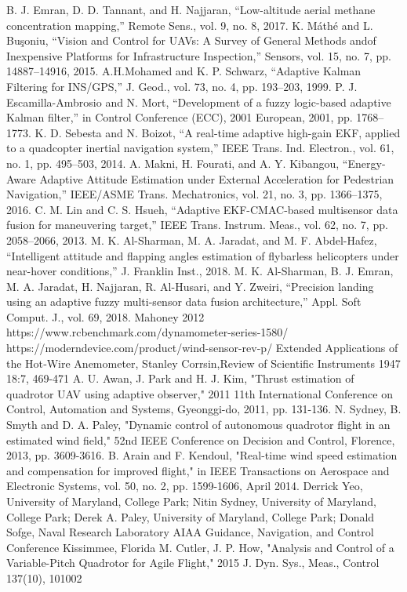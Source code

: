 \documentclass[conference]{IEEEtran}
\begin{document}
\begin{thebibliography}{00}
B. J. Emran, D. D. Tannant, and H. Najjaran, “Low-altitude aerial methane concentration mapping,” Remote Sens., vol. 9, no. 8, 2017.
 K. Máthé and L. Buşoniu, “Vision and Control for UAVs: A Survey of General Methods andof Inexpensive Platforms for Infrastructure Inspection,” Sensors, vol. 15, no. 7, pp. 14887–14916, 2015.
 A.H.Mohamed and K. P. Schwarz, “Adaptive Kalman Filtering for INS/GPS,” J. Geod., vol. 73, no. 4, pp. 193–203, 1999.
 P. J. Escamilla-Ambrosio and N. Mort, “Development of a fuzzy logic-based adaptive Kalman filter,” in Control Conference (ECC), 2001 European, 2001, pp. 1768–1773.
 K. D. Sebesta and N. Boizot, “A real-time adaptive high-gain EKF, applied to a quadcopter inertial navigation system,” IEEE Trans. Ind. Electron., vol. 61, no. 1, pp. 495–503, 2014.
 A. Makni, H. Fourati, and A. Y. Kibangou, “Energy-Aware Adaptive Attitude Estimation under External Acceleration for Pedestrian Navigation,” IEEE/ASME Trans. Mechatronics, vol. 21, no. 3, pp. 1366–1375, 2016.
 C. M. Lin and C. S. Hsueh, “Adaptive EKF-CMAC-based multisensor data fusion for maneuvering target,” IEEE Trans. Instrum. Meas., vol. 62, no. 7, pp. 2058–2066, 2013.
 M. K. Al-Sharman, M. A. Jaradat, and M. F. Abdel-Hafez, “Intelligent attitude and flapping angles estimation of flybarless helicopters under near-hover conditions,” J. Franklin Inst., 2018.
 M. K. Al-Sharman, B. J. Emran, M. A. Jaradat, H. Najjaran, R. Al-Husari, and Y. Zweiri, “Precision landing using an adaptive fuzzy multi-sensor data fusion architecture,” Appl. Soft Comput. J., vol. 69, 2018.
		 Mahoney 2012
 https://www.rcbenchmark.com/dynamometer-series-1580/
 https://moderndevice.com/product/wind-sensor-rev-p/
 Extended Applications of the Hot‐Wire Anemometer, Stanley Corrsin,Review of Scientific Instruments 1947 18:7, 469-471 
 A. U. Awan, J. Park and H. J. Kim, "Thrust estimation of quadrotor UAV using adaptive observer," 2011 11th International Conference on Control, Automation and Systems, Gyeonggi-do, 2011, pp. 131-136.
 N. Sydney, B. Smyth and D. A. Paley, "Dynamic control of autonomous quadrotor flight in an estimated wind field," 52nd IEEE Conference on Decision and Control, Florence, 2013, pp. 3609-3616.
 B. Arain and F. Kendoul, "Real-time wind speed estimation and compensation for improved flight," in IEEE Transactions on Aerospace and Electronic Systems, vol. 50, no. 2, pp. 1599-1606, April 2014.
Derrick Yeo, University of Maryland, College Park; Nitin Sydney, University of Maryland, College Park; Derek A. Paley, University of Maryland, College Park; Donald Sofge, Naval Research Laboratory AIAA Guidance, Navigation, and Control Conference Kissimmee, Florida
  M. Cutler, J. P. How, "Analysis and Control of a Variable-Pitch Quadrotor for Agile Flight," 2015
J. Dyn. Sys., Meas., Control 137(10), 101002
\end{thebibliography}
\end{document}
